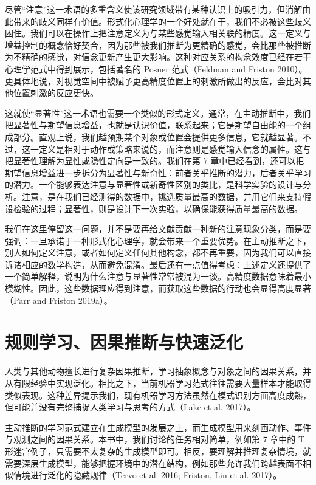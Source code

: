 尽管“注意”这一术语的多重含义使该研究领域带有某种认识上的吸引力，但消解由此带来的歧义同样有价值。形式化心理学的一个好处就在于，我们不必被这些歧义困住。我们可以在操作上把注意定义为与某些感觉输入相关联的精度。这一定义与增益控制的概念恰好契合，因为那些被我们推断为更精确的感觉，会比那些被推断为不精确的感觉，对信念更新产生更大影响。这种对应关系的构念效度已经在若干心理学范式中得到展示，包括著名的 Posner 范式（Feldman and Friston 2010）。更具体地说，对视觉空间中被赋予更高精度位置上的刺激所做出的反应，会比对其他位置刺激的反应更快。

这就使“显著性”这一术语也需要一个类似的形式定义。通常，在主动推断中，我们把显著性与期望信息增益，也就是认识价值，联系起来；它是期望自由能的一个组成部分。直观上说，我们越预期某个对象或位置会提供更多信息，它就越显著。不过，这一定义是相对于动作或策略来说的，而注意则是感觉输入信念的属性。这与把显著性理解为显性或隐性定向是一致的。我们在第 7 章中已经看到，还可以把期望信息增益进一步拆分为显著性与新奇性：前者关乎推断的潜力，后者关乎学习的潜力。一个能够表达注意与显著性或新奇性区别的类比，是科学实验的设计与分析。注意，是在我们已经测得的数据中，挑选质量最高的数据，并用它们来支持假设检验的过程；显著性，则是设计下一次实验，以确保能获得质量最高的数据。

我们在这里停留这一问题，并不是要再给文献贡献一种新的注意现象分类，而是要强调：一旦承诺于一种形式化心理学，就会带来一个重要优势。在主动推断之下，别人如何定义注意，或者如何定义任何其他构念，都不再重要，因为我们可以直接诉诸相应的数学构造，从而避免混淆。最后还有一点值得考虑：上述定义还提供了一个简单解释，说明为什么注意与显著性常常被混为一谈。高精度数据意味着最小模糊性。因此，这些数据理应得到注意，而获取这些数据的行动也会显得高度显著（Parr and Friston 2019a）。

\section{规则学习、因果推断与快速泛化}

人类与其他动物擅长进行复杂因果推断，学习抽象概念与对象之间的因果关系，并从有限经验中实现泛化。相比之下，当前机器学习范式往往需要大量样本才能取得类似表现。这种差异提示我们，现有机器学习方法虽然在模式识别方面高度成熟，但可能并没有完整捕捉人类学习与思考的方式（Lake et al. 2017）。

主动推断的学习范式建立在生成模型的发展之上，而生成模型用来刻画动作、事件与观测之间的因果关系。本书中，我们讨论的任务相对简单，例如第 7 章中的 T 形迷宫例子，只需要不太复杂的生成模型即可。相反，要理解并推理复杂情境，就需要深层生成模型，能够把握环境中的潜在结构，例如那些允许我们跨越表面不相似情境进行泛化的隐藏规律（Tervo et al. 2016; Friston, Lin et al. 2017）。

